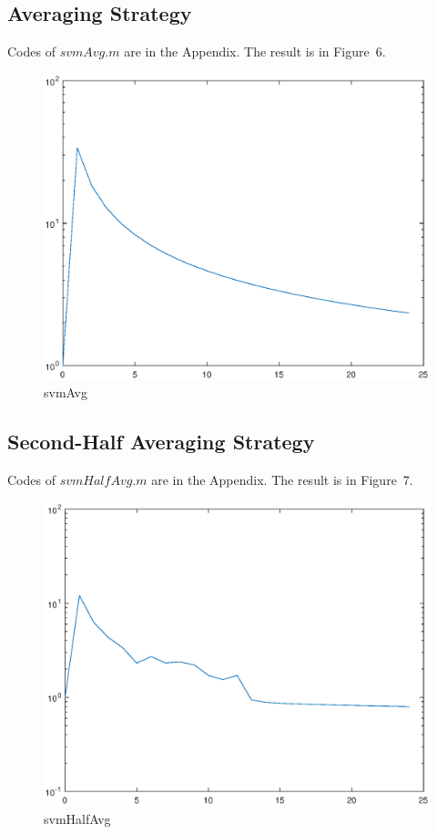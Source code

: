 \documentclass{article}
\begin{document}
\subsection{Averaging Strategy}
Codes of $svmAvg.m$ are in the Appendix. The result is in Figure~6.
\begin{figure}
\centering
\includegraphics[scale=0.4]{6.eps}
\caption{svmAvg}
\end{figure}

\subsection{Second-Half Averaging Strategy}
Codes of $svmHalfAvg.m$ are in the Appendix. The result is in Figure~7.
\begin{figure}
\centering
\includegraphics[scale=0.4]{7.eps}
\caption{svmHalfAvg}
\end{figure}
\end{document}
